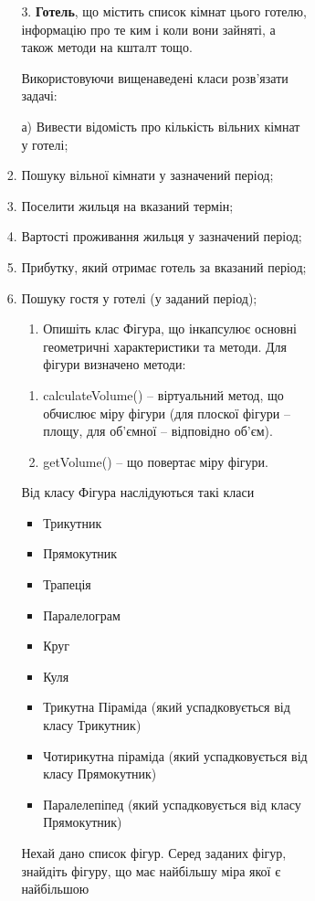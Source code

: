 \documentclass[]{article}
\makeatletter
\newcommand{\xslalph}[1]{\expandafter\@xslalph\csname c@#1\endcsname}
\newcommand{\@xslalph}[1]{%
    \ifcase#1\or а\or б\or в\or г\or д\or e\or є\or ж\or з\or i%
    \or й\or к\or л\or м\or н\or о\or п\or р\or с\or т%
    \or у\or ф\or х\or ц\or ч\or ш\or ю\or я\or аа\or бб\or вв%
    \else\@ctrerr\fi%
}
\makeatother
\begin{document}
\begin{enumerate}
\begin{enumerate}[label=\xslalph*)]
\begin{enumerate}
\begin{enumerate}[label=\xslalph*)]
\begin{enumerate}
\begin{enumerate}[label=\xslalph*)]
\begin{enumerate}
\begin{enumerate}[label=\xslalph*)]
3. \textbf{Готель}, що містить список кімнат цього готелю, інформацію
про те ким і коли вони зайняті, а також методи на кшталт тощо.

Використовуючи вищенаведені класи розв'язати задачі:

а) Вивести відомість про кількість вільних кімнат у готелі;
\item Пошуку вільної кімнати у зазначений період;
\item Поселити жильця на вказаний термін;
\item Вартості проживання жильця у зазначений період;
\item Прибутку, який отримає готель за вказаний період;
\item Пошуку гостя у готелі (у заданий період);

\begin{enumerate}
\def\labelenumi{\arabic{enumi})}
\item
  Опишіть клас Фігура, що інкапсулює основні геометричні характеристики
  та методи. Для фігури визначено методи:
\end{enumerate}

\begin{enumerate}
\def\labelenumi{\arabic{enumi}.}
\item
  calculateVolume() -- віртуальний метод, що обчислює міру фігури (для
  плоскої фігури -- площу, для об'ємної -- відповідно об'єм).
\item
  getVolume() -- що повертає міру фігури.
\end{enumerate}

Від класу Фігура наслідуються такі класи

\begin{itemize}
\item
  Трикутник
\item
  Прямокутник
\item
  Трапеція
\item
  Паралелограм
\item
  Круг
\item
  Куля
\item
  Трикутна Піраміда (який успадковується від класу Трикутник)
\item
  Чотирикутна піраміда (який успадковується від класу Прямокутник)
\item
  Паралелепіпед (який успадковується від класу Прямокутник)
\end{itemize}

Нехай дано список фігур. Серед заданих фігур, знайдіть фігуру, що має
найбільшу міра якої є найбільшою


\end{enumerate}
\end{enumerate}
\end{enumerate}
\end{enumerate}
\end{enumerate}
\end{enumerate}
\end{enumerate}
\end{enumerate}
\end{document}
